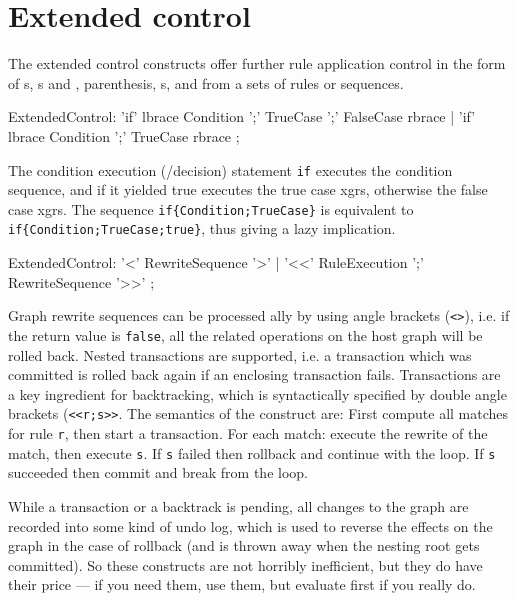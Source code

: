 \section{Extended control}

The extended control constructs offer further rule application control in the form of s, s and , parenthesis, s, and  from a sets of rules or sequences.

\begin{rail} 
  ExtendedControl: 
	'if' lbrace Condition ';' TrueCase ';' FalseCase rbrace |
	'if' lbrace Condition ';' TrueCase rbrace
	;
\end{rail}

The condition execution (/decision) statement \texttt{if} executes the condition sequence, and if it yielded true executes the true case xgrs, otherwise the false case xgrs.
The sequence \verb#if{Condition;TrueCase}# is equivalent to \verb#if{Condition;TrueCase;true}#, thus giving a lazy implication.

\begin{rail} 
  ExtendedControl: 
    '<' RewriteSequence '>' | 
    '<<' RuleExecution ';' RewriteSequence '>>'
	;
\end{rail}

Graph rewrite sequences can be processed ally by using angle brackets (\texttt{<>}), i.e.
if the return value is \texttt{false}, all the related operations on the host graph will be rolled back.
Nested transactions are supported, i.e. a transaction which was committed is rolled back again if an enclosing transaction fails.
Transactions are a key ingredient for backtracking, which is syntactically specified by double angle brackets (\texttt{<<r;s>>}.
The semantics of the construct are:
First compute all matches for rule \texttt{r}, then start a transaction.
For each match: execute the rewrite of the match, then execute \texttt{s}.
If \texttt{s} failed then rollback and continue with the loop.
If \texttt{s} succeeded then commit and break from the loop.

\begin{note}
While a transaction or a backtrack is pending, all changes to the graph are recorded into some kind of undo log, which is used to reverse the effects on the graph in the case of rollback (and is thrown away when the nesting root gets committed).
So these constructs are not horribly inefficient, but they do have their price --- if you need them, use them, but evaluate first if you really do.
\end{note}

